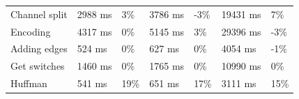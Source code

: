 \begin{table}[H]
\begin{tabular}{@{}lllllll@{}}
        Channel split           & 2988 ms                                                                                   & 3\%                                                                            & 3786 ms                                                                                    & -3\%                                                                          & 19431 ms                                                                                & 7\%                                                                           \\
        Encoding                & 4317 ms                                                                                   & 0\%                                                                            & 5145 ms                                                                                    & 3\%                                                                           & 29396 ms                                                                                & -3\%                                                                          \\
        Adding edges            & 524 ms                                                                                    & 0\%                                                                            & 627 ms                                                                                     & 0\%                                                                           & 4054 ms                                                                                 & -1\%                                                                          \\
        Get switches            & 1460 ms                                                                                   & 0\%                                                                            & 1765 ms                                                                                    & 0\%                                                                           & 10990 ms                                                                                & 0\%                                                                           \\
        Huffman                 & 541 ms                                                                                    & 19\%                                                                           & 651 ms                                                                                     & 17\%                                                                          & 3111 ms                                                                                 & 15\%                                                                          \\ \midrule

\end{tabular}
\end{table}
